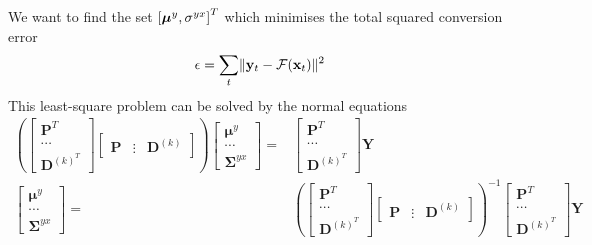 We want to find the set $\left[\boldsymbol{\mu}^y, \mathbf{\sigma}^{yx}\right]^T$ which minimises  the total squared conversion error
\begin{equation}
	\label{eq:conversion_error}
	\epsilon = \sum_{t} \lVert\mathbf{y}_t - \mathcal{F}(\mathbf{x}_t)\rVert^2
\end{equation}
This least-square problem can be solved by the normal equations \cite{strang06}
\begin{equation}
	\label{eq:param_computed}
	\begin{split}
		\left( 
		\begin{bmatrix}
			\mathbf{P}^T \\
			\dotsi \\
			\mathbf{D}^{(k)^T}
		\end{bmatrix}
		\begin{bmatrix}
			\mathbf{P} & \vdots & \mathbf{D}^{(k)}
		\end{bmatrix}
		 \right)
		\begin{bmatrix}
			\boldsymbol{\mu}^y \\
			\dotsi \\
			\mathbf{\Sigma}^{yx}
		\end{bmatrix}
		= &
		\begin{bmatrix}
			\mathbf{P}^T \\
			\dotsi \\
			\mathbf{D}^{(k)^T}
		\end{bmatrix}
		\mathbf{Y} \\ %
		\begin{bmatrix}
			\boldsymbol{\mu}^y \\
			\dotsi \\
			\mathbf{\Sigma}^{yx}
		\end{bmatrix}
		= &
		\left( 
		\begin{bmatrix}
			\mathbf{P}^T \\
			\dotsi \\
			\mathbf{D}^{(k)^T}
		\end{bmatrix}
		\begin{bmatrix}
			\mathbf{P} & \vdots & \mathbf{D}^{(k)}
		\end{bmatrix}
		 \right)^{-1}
		\begin{bmatrix}
			\mathbf{P}^T \\
			\dotsi \\
			\mathbf{D}^{(k)^T}
		\end{bmatrix}
		\mathbf{Y} \\ %
	\end{split}
\end{equation}

